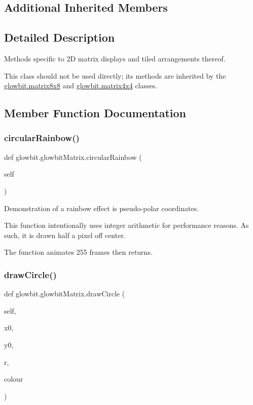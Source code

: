 \subsection*{Additional Inherited Members}


\subsection{Detailed Description}
Methods specific to 2D matrix displays and tiled arrangements thereof. 

This class should not be used directly; its methods are inherited by the \hyperlink{classglowbit_1_1matrix8x8}{glowbit.\+matrix8x8} and \hyperlink{classglowbit_1_1matrix4x4}{glowbit.\+matrix4x4} classes. 

\subsection{Member Function Documentation}
\mbox{\label{classglowbit_1_1glowbitMatrix_adf29bdb4294bcf27ae560130b0fcae35}} 
\subsubsection{\texorpdfstring{circular\+Rainbow()}{circularRainbow()}}
{\footnotesize\ttfamily def glowbit.\+glowbit\+Matrix.\+circular\+Rainbow (\begin{DoxyParamCaption}\item[{}]{self }\end{DoxyParamCaption})}



Demonstration of a rainbow effect is pseudo-\/polar coordinates. 

This function intentionally uses integer arithmetic for performance reasons. As such, it is drawn half a pixel off center.

The function animates 255 frames then returns. \mbox{\label{classglowbit_1_1glowbitMatrix_a4efec5ce17c30403505b1f2775022e90}} 
\subsubsection{\texorpdfstring{draw\+Circle()}{drawCircle()}}
{\footnotesize\ttfamily def glowbit.\+glowbit\+Matrix.\+draw\+Circle (\begin{DoxyParamCaption}\item[{}]{self,  }\item[{}]{x0,  }\item[{}]{y0,  }\item[{}]{r,  }\item[{}]{colour }\end{DoxyParamCaption})}



